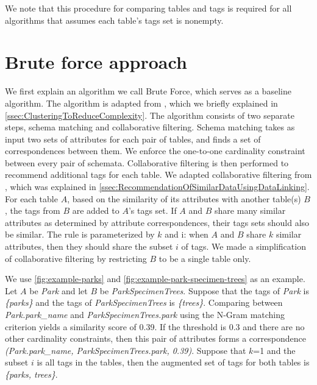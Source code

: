 We note that this procedure for comparing tables and tags is required for all algorithms that assumes each table\textquoteright s tags set is nonempty.

\section{Brute force approach}
\label{sec:BruteForceApproach}

We first explain an algorithm we call Brute Force, which serves as a baseline algorithm. The algorithm is adapted from \cite{Smith2011Unity}, which we briefly explained in \autoref{ssec:ClusteringToReduceComplexity}. The algorithm consists of two separate steps, schema matching and collaborative filtering. Schema matching takes as input two sets of attributes for each pair of tables, and finds a set of correspondences between them. We enforce the one-to-one cardinality constraint between every pair of schemata. Collaborative filtering is then performed to recommend additional tags for each table. We adapted collaborative filtering from \cite{conf/esws/EllefiBDT16}, which was explained in \autoref{ssec:RecommendationOfSimilarDataUsingDataLinking}. For each table $A$, based on the similarity of its attributes with another table(s) $B$, the tags from $B$ are added to $A$'s tags set. If $A$ and $B$ share many similar attributes as determined by attribute correspondences, their tags sets should also be similar. The rule is parameterized by $k$ and i: when $A$ and $B$ share $k$ similar attributes, then they should share the subset $i$ of tags. We made a simplification of collaborative filtering by restricting $B$ to be a single table only.

We use \autoref{fig:example-parks} and \autoref{fig:example-park-specimen-trees} as an example. Let $A$ be \textit{Park} and let $B$ be \textit{ParkSpecimenTrees}. Suppose that the tags of \textit{Park} is \textit{\{parks\}} and the tags of \textit{ParkSpecimenTrees} is \textit{\{trees\}}. Comparing between \textit{Park.park\_name} and \textit{ParkSpecimenTrees.park} using the N-Gram matching criterion yields a similarity score of 0.39. If the threshold is 0.3 and there are no other cardinality constraints, then this pair of attributes forms a correspondence \textit{(Park.park\_name, ParkSpecimenTrees.park, 0.39)}. Suppose that $k$=1 and the subset $i$ is all tags in the tables, then the augmented set of tags for both tables is \textit{\{parks, trees\}}.

